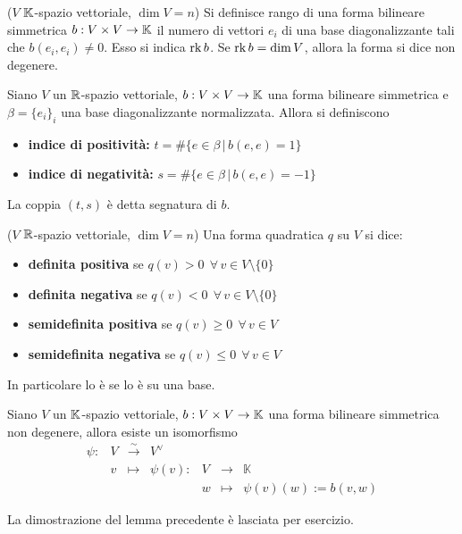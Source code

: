 \documentclass{article}     %
\begin{document}
\begin{boxdef}[Rango]
    ($V$ $\mathbb{K}$-spazio vettoriale, $\dim V=n$) Si definisce rango di una forma bilineare simmetrica $b:V\times V\to \mathbb{K}$ il numero di vettori $e_i$ di una base diagonalizzante tali che $b(e_i,e_i)\neq 0$. Esso si indica $\operatorname{rk} b$. Se $\operatorname{rk} b=\dim V$, allora la forma si dice non degenere.
\end{boxdef}
\begin{boxdef}[Segnatura]
    Siano $V$ un $\mathbb{R}$-spazio vettoriale, $b:V\times V\to \mathbb{K}$ una forma bilineare simmetrica e $\beta=\{e_i\}_i$ una base diagonalizzante normalizzata. 
    Allora si definiscono
    \begin{itemize}
        \item \textbf{indice di positività:} $t=\#\{e\in \beta\,|\, b(e,e)=1\}$
        \item \textbf{indice di negatività:} $s=\#\{e\in \beta\,|\, b(e,e)=-1\}$
    \end{itemize}
    La coppia $(t,s)$ è detta segnatura di $b$.
\end{boxdef}
\begin{boxdef}
    ($V$ $\mathbb{R}$-spazio vettoriale, $\dim V=n$) Una forma quadratica $q$ su $V$ si dice:
    \begin{itemize}
        \item \textbf{definita positiva} se $q(v)>0\ \ \forall\,v\in V\setminus\{0\} $
        \item \textbf{definita negativa} se $q(v)<0\ \ \forall\,v\in V \setminus\{0\}$
        \item \textbf{semidefinita positiva} se $q(v)\geq0\ \ \forall\,v\in V $
        \item \textbf{semidefinita negativa} se $q(v)\leq0\ \ \forall\,v\in V $ 
    \end{itemize}
\end{boxdef}
In particolare lo è se lo è su una base.
\begin{lemma}
    Siano $V$ un $\mathbb{K}$-spazio vettoriale, $b:V\times V\to \mathbb{K}$ una forma bilineare simmetrica non degenere, allora esiste un isomorfismo
    \[\begin{array}{ccccccl}            \psi : & V & \overset{\sim}{\longrightarrow}& V^\vee \\                 & v & \longmapsto     & \psi(v) : & V & \longrightarrow & \mathbb{K} \\&&&                 & w & \longmapsto     &\psi(v)(w):=b(v,w)       \end{array}\]
\end{lemma}
\begin{exc}\label{exc: lemma finestra}
    La dimostrazione del lemma precedente è lasciata per esercizio. 
\end{exc}
\end{document}
